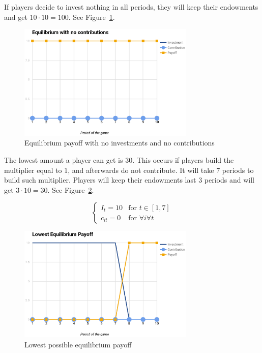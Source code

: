 			If players decide to invest nothing in all periods, they will keep their endowments and get $10 \cdot 10 = 100$. See Figure~\ref{fig:nash-nocontrib}.

			\begin{figure}
				\begin{center}
					\includegraphics[width=8.4cm]{resources/eps/nash-nocontrib.eps}
					\caption{Equilibrium payoff with no investments and no contributions} 
					\label{fig:nash-nocontrib}
				\end{center}
			\end{figure}

			The lowest amount a player can get is $30$. This occurs if players build the multiplier equal to $1$, and afterwards do not contribute. It will take $7$ periods to build such multiplier. Players will keep their endowments last $3$ periods and will get $3 \cdot 10 = 30$. See Figure~\ref{fig:nash-lowest}.

			\[
				\begin{cases}
					I_t = 10 	& \text{for } t \in [1, 7] \\
					c_{it} = 0	& \text{for } \forall i \forall t
				\end{cases}
			\]

			\begin{figure}
				\begin{center}
					\includegraphics[width=8.4cm]{resources/eps/nash-lowest.eps}
					\caption{Lowest possible equilibrium payoff} 
					\label{fig:nash-lowest}
				\end{center}
			\end{figure}

